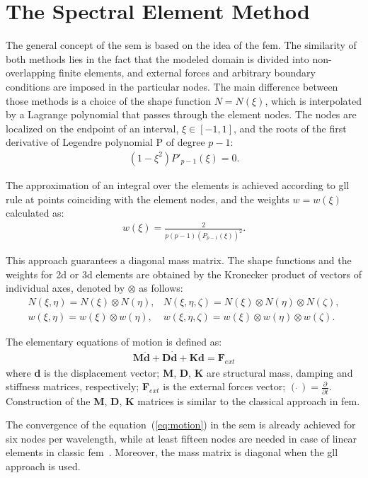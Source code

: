 \section{The Spectral Element Method}
\label{sec:sem}


The general concept of the \ac{sem} is based on the idea of the \ac{fem}.
The similarity of both methods lies in the fact that the modeled domain is divided into non-overlapping finite elements, and external forces and arbitrary boundary conditions are imposed in the particular nodes.
The main difference between those methods is a choice of the shape function \( N=N(\xi )\), which is interpolated by a Lagrange polynomial that passes through the element nodes. The nodes are localized on the endpoint of an interval, \(\xi\in[-1,1]\), and the roots of the first derivative of Legendre polynomial P of degree \(p-1\):
\begin{eqnarray}
	(1-\xi^2)P'_{p-1}(\xi)=0.
	\label{eq:nodes}
\end{eqnarray}

The approximation of an integral over the elements is achieved according to \ac{gll} rule at points coinciding with the element nodes, 
and the weights \(w=w(\xi)\) calculated as:
\begin{eqnarray}
	{w(\xi)} = \frac{2}{p(p-1)(P_{p-1}(\xi))^2}.
	\label{eq:weights}
\end{eqnarray}

This approach guarantees a diagonal mass matrix.
The shape functions and the weights for \ac{2d} or \ac{3d} elements are obtained by the Kronecker product of vectors of individual axes, denoted by \(\otimes\) as follows:
\begin{eqnarray}
	N(\xi,\eta) = N(\xi)\otimes N(\eta), & N(\xi,\eta,\zeta) = N(\xi)\otimes N(\eta)\otimes N(\zeta), \nonumber\\
	w(\xi,\eta) = w(\xi)\otimes w(\eta), & w(\xi,\eta,\zeta) = w(\xi)\otimes w(\eta)\otimes w(\zeta).
	\label{eq:3Dshape_weights}
\end{eqnarray}

The elementary equations of motion is defined as:
\begin{eqnarray}
	\label{eq:motion}
	\textbf{M} \ddot{\textbf{d}} + \textbf{D} \dot{\textbf{d}} + \textbf{K} \textbf{d} = \textbf{F}_{ext}
\end{eqnarray}
where \textbf{d} is the displacement vector; \textbf{M}, \textbf{D}, \textbf{K} are structural mass, damping and stiffness matrices, respectively; \textbf{F}$_{ext}$ is the external forces vector; \((\dot{\ })=\frac{\partial}{\partial t}\). Construction of the \textbf{M}, \textbf{D}, \textbf{K} matrices is similar to the classical approach in \ac{fem}.

The convergence of the equation~(\ref{eq:motion}) in the \ac{sem} is already achieved for six nodes per wavelength, while at least fifteen nodes are needed in case of linear elements in classic \ac{fem}~\cite{wee2017simulating}. Moreover, the mass matrix is diagonal when the \ac{gll} approach is used.

